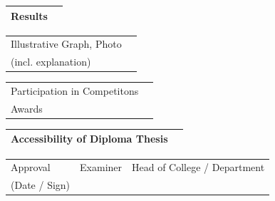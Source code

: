 \begin{tabular}{|p{\feldC}|p{\feldD}|}
 \hline
 Results & \\
 \hline
\end{tabular}

\begin{tabular}{|p{\feldC}|p{\feldD}|}
 \hline
 Illustrative Graph, Photo & \\
 (incl. explanation) & \\
 \hline
\end{tabular}

\begin{tabular}{|p{\feldC}|p{\feldD}|}
 \hline
 Participation in Competitons & \\
 Awards & \\
 \hline
\end{tabular}

\begin{tabular}{|p{\feldC}|p{\feldD}|}
 \hline
 Accessibility of Diploma Thesis & \\
 \hline
\end{tabular}

\begin{tabular}{|p{\feldC}|p{\feldE}|p{\feldE}|}
 \hline
 Approval & \scriptsize{Examiner} & \scriptsize{Head of College / Department}\\ 
 (Date / Sign)& & \\
 \hline
\end{tabular}
\linespread{1.25} \normalsize
